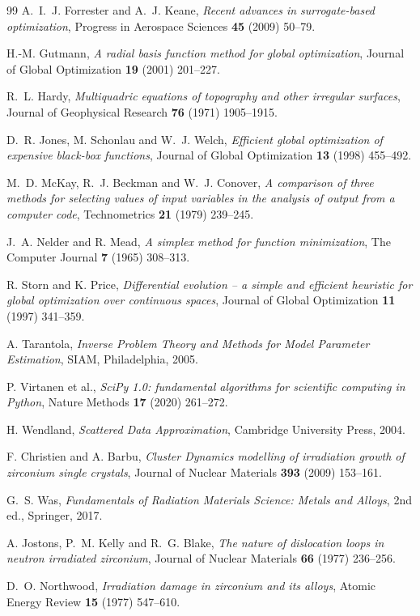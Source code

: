 \documentclass[11pt]{article}
\begin{document}
\begin{thebibliography}{99}
A.~I.~J. Forrester and A.~J. Keane,
\emph{Recent advances in surrogate-based optimization},
Progress in Aerospace Sciences \textbf{45} (2009) 50--79.

H.-M. Gutmann,
\emph{A radial basis function method for global optimization},
Journal of Global Optimization \textbf{19} (2001) 201--227.

R.~L. Hardy,
\emph{Multiquadric equations of topography and other irregular surfaces},
Journal of Geophysical Research \textbf{76} (1971) 1905--1915.

D.~R. Jones, M. Schonlau and W.~J. Welch,
\emph{Efficient global optimization of expensive black-box functions},
Journal of Global Optimization \textbf{13} (1998) 455--492.

M.~D. McKay, R.~J. Beckman and W.~J. Conover,
\emph{A comparison of three methods for selecting values of input variables in the
analysis of output from a computer code},
Technometrics \textbf{21} (1979) 239--245.

J.~A. Nelder and R. Mead,
\emph{A simplex method for function minimization},
The Computer Journal \textbf{7} (1965) 308--313.

R. Storn and K. Price,
\emph{Differential evolution -- a simple and efficient heuristic for global
optimization over continuous spaces},
Journal of Global Optimization \textbf{11} (1997) 341--359.

A. Tarantola,
\emph{Inverse Problem Theory and Methods for Model Parameter Estimation},
SIAM, Philadelphia, 2005.

P. Virtanen et al.,
\emph{SciPy 1.0: fundamental algorithms for scientific computing in Python},
Nature Methods \textbf{17} (2020) 261--272.

H. Wendland,
\emph{Scattered Data Approximation},
Cambridge University Press, 2004.

F. Christien and A. Barbu,
\emph{Cluster Dynamics modelling of irradiation growth of zirconium single crystals},
Journal of Nuclear Materials \textbf{393} (2009) 153--161.

G.~S. Was,
\emph{Fundamentals of Radiation Materials Science: Metals and Alloys},
2nd ed., Springer, 2017.

A. Jostons, P.~M. Kelly and R.~G. Blake,
\emph{The nature of dislocation loops in neutron irradiated zirconium},
Journal of Nuclear Materials \textbf{66} (1977) 236--256.

D.~O. Northwood,
\emph{Irradiation damage in zirconium and its alloys},
Atomic Energy Review \textbf{15} (1977) 547--610.
\end{thebibliography}
\end{document}

